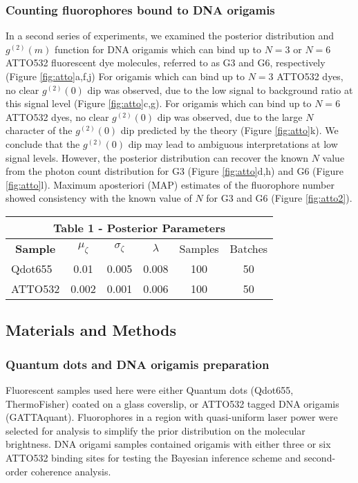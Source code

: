 \subsubsection{Counting fluorophores bound to DNA origamis}


In a second series of experiments, we examined the posterior distribution and $g^{(2)}(m)$ function for DNA origamis which can bind up to $N=3$ or $N=6$ ATTO532 fluorescent dye molecules, referred to as G3 and G6, respectively (Figure \ref{fig:atto}a,f,j) For origamis which can bind up to $N=3$ ATTO532 dyes, no clear $g^{(2)}(0)$ dip was observed, due to the low signal to background ratio at this signal level (Figure \ref{fig:atto}c,g). For origamis which can bind up to $N=6$ ATTO532 dyes, no clear $g^{(2)}(0)$ dip was observed, due to the large $N$ character of the $g^{(2)}(0)$ dip predicted by the theory (Figure \ref{fig:atto}k). We conclude that the $g^{(2)}(0)$ dip may lead to ambiguous interpretations at low signal levels. However, the posterior distribution can recover the known $N$ value from the photon count distribution for G3 (Figure \ref{fig:atto}d,h) and G6 (Figure \ref{fig:atto}l). Maximum aposteriori (MAP) estimates of the fluorophore number showed consistency with the known value of $N$ for G3 and G6 (Figure \ref{fig:atto2}). 

\clearpage
\begin{table}
\centering
\begin{tabular}{lccccc}
\multicolumn{6}{c}{\textbf{Table 1 - Posterior Parameters}} \\ \hline
\multicolumn{1}{c}{\textbf{Sample}}  & $\mu_{\zeta}$ & $\sigma_{\zeta}$ & $\lambda$ & Samples & Batches \\
Qdot655 & 0.01 & 0.005 & 0.008 & 100 & 50 \\
ATTO532 & 0.002 & 0.001 & 0.006 & 100 & 50 \\
\end{tabular}
\end{table}

\subsection{Materials and Methods}

\subsubsection{Quantum dots and DNA origamis preparation}

Fluorescent samples used here were either Quantum dots (Qdot655, ThermoFisher) coated on a glass coverslip, or ATTO532 tagged DNA origamis (GATTAquant). Fluorophores in a region with quasi-uniform laser power were selected for analysis to simplify the prior distribution on the molecular brightness. DNA origami samples contained origamis with either three or six ATTO532 binding sites for testing the Bayesian inference scheme and second-order coherence analysis. 


